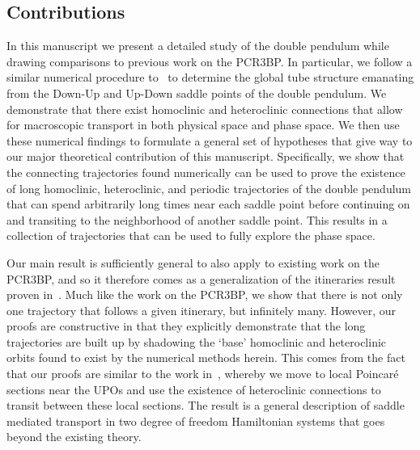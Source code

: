 \documentclass[11pt]{article}
\numberwithin{equation}{section}
\theoremstyle{plain}
\begin{document}
\subsection{Contributions}

In this manuscript we present a detailed study of the double pendulum while drawing comparisons to previous work on the PCR3BP. In particular, we follow a similar numerical procedure to~\cite{RossBook,Koon,Barcelona} to determine the global tube structure emanating from the Down-Up and Up-Down saddle points of the double pendulum. We demonstrate that there exist homoclinic and heteroclinic connections that allow for macroscopic transport in both physical space and phase space. We then use these numerical findings to formulate a general set of hypotheses that give way to our major theoretical contribution of this manuscript. Specifically, we show that the connecting trajectories found numerically can be used to prove the existence of long homoclinic, heteroclinic, and periodic trajectories of the double pendulum that can spend arbitrarily long times near each saddle point before continuing on and transiting to the neighborhood of another saddle point. This results in a collection of trajectories that can be used to fully explore the phase space.

Our main result is sufficiently general to also apply to existing work on the PCR3BP, and so it therefore comes as a generalization of the itineraries result proven in~\cite{Koon}. Much like the work on the PCR3BP, we show that there is not only one trajectory that follows a given itinerary, but infinitely many. However, our proofs are constructive in that they explicitly demonstrate that the long trajectories are built up by shadowing the `base' homoclinic and heteroclinic orbits found to exist by the numerical methods herein. This comes from the fact that our proofs are similar to the work in~\cite{BramLDS,BramIsola}, whereby we move to local Poincar\'e sections near the UPOs and use the existence of heteroclinic connections to transit between these local sections. The result is a general description of saddle mediated transport in two degree of freedom Hamiltonian systems that goes beyond the existing theory.   
\end{document}
